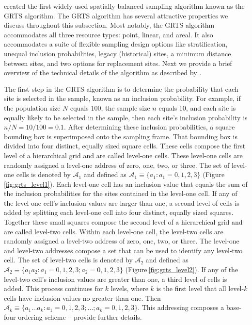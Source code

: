 \documentclass[
  shortnames]{jss}
\begin{document}
\citet{stevens2004grts} created the first widely-used spatially balanced
sampling algorithm known as the GRTS algorithm. The GRTS algorithm has
several attractive properties we discuss throughout this subsection.
Most notably, the GRTS algorithm accommodates all three resource types:
point, linear, and areal. It also accommodates a suite of flexible
sampling design options like stratification, unequal inclusion
probabilities, legacy (historical) sites, a minimum distance between
sites, and two options for replacement sites. Next we provide a brief
overview of the technical details of the algorithm as described by
\citet{stevens2004grts}.

The first step in the GRTS algorithm is to determine the probability
that each site is selected in the sample, known as an inclusion
probability. For example, if the population size \(N\) equals 100, the
sample size \(n\) equals 10, and each site is equally likely to be
selected in the sample, then each site's inclusion probability is
\(n / N = 10/100 = 0.1\). After determining these inclusion
probabilities, a square bounding box is superimposed onto the sampling
frame. That bounding box is divided into four distinct, equally sized
square cells. These cells compose the first level of a hierarchical grid
and are called level-one cells. These level-one cells are randomly
assigned a level-one address of zero, one, two, or three. The set of
level-one cells is denoted by \(\mathcal{A}_1\) and defined as
\(\mathcal{A}_1 \equiv \{a_1: a_1 = 0, 1, 2, 3\}\)
(Figure\(~\)\ref{fig:grts_level1}). Each level-one cell has an inclusion
value that equals the sum of the inclusion probabilities for the sites
contained in the level-one cell. If any of the level-one cell's
inclusion values are larger than one, a second level of cells is added
by splitting each level-one cell into four distinct, equally sized
squares. Together these small squares compose the second level of a
hierarchical grid and are called level-two cells. Within each level-one
cell, the level-two cells are randomly assigned a level-two address of
zero, one, two, or three. The level-one and level-two addresses compose
a set that can be used to identify any level-two cell. The set of
level-two cells is denoted by \(\mathcal{A}_2\) and defined as
\(\mathcal{A}_2 \equiv \{a_1a_2: a_1 = 0, 1, 2, 3; a_2 = 0, 1, 2, 3\}\)
(Figure\(~\)\ref{fig:grts_level2}). If any of the level-two cell's
inclusion values are greater than one, a third level of cells is added.
This process continues for \(k\) levels, where \(k\) is the first level
that all level-\(k\) cells have inclusion values no greater than one.
Then
\(\mathcal{A}_k \equiv \{a_1...a_k : a_1 = 0, 1, 2, 3; ...; a_k = 0, 1, 2, 3\}\).
This addressing composes a base-four ordering scheme --
\citet{stevens2004grts} provide further details.
\end{document}
